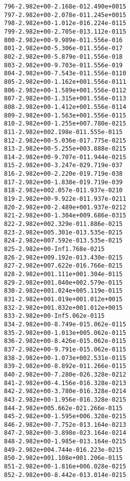 \begin{alltt}
 796  -2.982e+00  -2.168e-01   2.490e+00   15
 797  -2.982e+00  -2.078e-01   1.245e+00   15
 798  -2.982e+00  -1.012e-01   6.224e-01   15
 799  -2.982e+00  -2.705e-01   3.112e-01   15
 800  -2.982e+00  -9.989e-01   1.556e-01    6
 801  -2.982e+00  -5.306e-01   1.556e-01    7
 802  -2.982e+00  -5.879e-01   1.556e-01    8
 803  -2.982e+00  -9.703e-01   1.556e-01    9
 804  -2.982e+00  -7.543e-01   1.556e-01   10
 805  -2.982e+00  -1.162e+00   1.556e-01   11
 806  -2.982e+00  -1.589e+00   1.556e-01   12
 807  -2.982e+00  -1.315e+00   1.556e-01   13
 808  -2.982e+00  -1.412e+00   1.556e-01   14
 809  -2.982e+00  -1.563e+00   1.556e-01   15
 810  -2.982e+00  -1.255e+00   7.780e-02   15
 811  -2.982e+00   2.198e-01   1.555e-01   15
 812  -2.982e+00  -5.036e-01   7.775e-02   15
 813  -2.982e+00  -5.255e+00   3.888e-02   15
 814  -2.982e+00  -9.707e-01   1.944e-02   15
 815  -2.982e+00  -3.247e-02   9.719e-03    7
 816  -2.982e+00  -2.220e-01   9.719e-03    8
 817  -2.982e+00  -1.838e-01   9.719e-03    9
 818  -2.982e+00   2.057e-01   1.937e-02   10
 819  -2.982e+00  -9.922e-01   1.937e-02   11
 820  -2.982e+00  -2.489e+00   1.937e-02   12
 821  -2.982e+00  -1.304e+00   9.686e-03   15
 822  -2.982e+00   2.329e-01   1.886e-02   15
 823  -2.982e+00   5.301e-01   3.535e-02   15
 824  -2.982e+00   7.592e-01   3.535e-02   15
 825  -2.982e+00        -Inf   1.768e-02   15
 826  -2.982e+00   9.192e-01   3.430e-02   15
 827  -2.982e+00   7.622e-01   6.766e-02   15
 828  -2.982e+00   1.111e+00   1.304e-01   15
 829  -2.982e+00   1.040e+00   2.579e-01   15
 830  -2.982e+00   1.024e+00   5.119e-01   15
 831  -2.982e+00   1.019e+00   1.012e+00   15
 832  -2.982e+00   1.032e+00   1.012e+00   15
 833  -2.982e+00        -Inf   5.062e-01   15
 834  -2.982e+00  -8.749e-01   5.062e-01   15
 835  -2.982e+00  -1.013e+00   5.062e-01   15
 836  -2.982e+00  -8.426e-01   5.062e-01   15
 837  -2.982e+00  -9.791e-01   5.062e-01   15
 838  -2.982e+00  -1.073e+00   2.531e-01   15
 839  -2.982e+00  -8.892e-01   1.266e-01   15
 840  -2.982e+00  -7.280e-02   6.328e-02   12
 841  -2.982e+00  -4.156e-01   6.328e-02   13
 842  -2.982e+00  -3.780e-01   6.328e-02   14
 843  -2.982e+00  -1.956e-01   6.328e-02   15
 844  -2.982e+00   5.662e-02   1.266e-01   15
 845  -2.982e+00  -1.595e+00   6.328e-02   15
 846  -2.982e+00  -7.752e-01   3.164e-02   13
 847  -2.982e+00  -3.898e-02   3.164e-02   14
 848  -2.982e+00  -1.985e-01   3.164e-02   15
 849  -2.982e+00   4.744e-01   6.223e-02   15
 850  -2.982e+00   1.108e+00   1.206e-01   15
 851  -2.982e+00  -1.816e+00   6.028e-02   15
 852  -2.982e+00  -8.442e-01   3.014e-02   15

\end{alltt}

